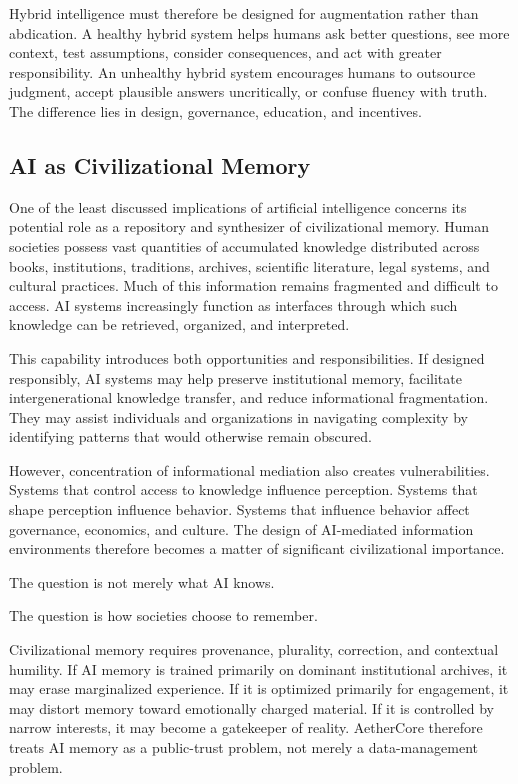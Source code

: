 \documentclass[12pt]{article}
\begin{document}
Hybrid intelligence must therefore be designed for augmentation rather than abdication. A healthy hybrid system helps humans ask better questions, see more context, test assumptions, consider consequences, and act with greater responsibility. An unhealthy hybrid system encourages humans to outsource judgment, accept plausible answers uncritically, or confuse fluency with truth. The difference lies in design, governance, education, and incentives.

\subsection{AI as Civilizational Memory}

One of the least discussed implications of artificial intelligence concerns its potential role as a repository and synthesizer of civilizational memory. Human societies possess vast quantities of accumulated knowledge distributed across books, institutions, traditions, archives, scientific literature, legal systems, and cultural practices. Much of this information remains fragmented and difficult to access. AI systems increasingly function as interfaces through which such knowledge can be retrieved, organized, and interpreted.

This capability introduces both opportunities and responsibilities. If designed responsibly, AI systems may help preserve institutional memory, facilitate intergenerational knowledge transfer, and reduce informational fragmentation. They may assist individuals and organizations in navigating complexity by identifying patterns that would otherwise remain obscured.

However, concentration of informational mediation also creates vulnerabilities. Systems that control access to knowledge influence perception. Systems that shape perception influence behavior. Systems that influence behavior affect governance, economics, and culture. The design of AI-mediated information environments therefore becomes a matter of significant civilizational importance.

The question is not merely what AI knows.

The question is how societies choose to remember.

Civilizational memory requires provenance, plurality, correction, and contextual humility. If AI memory is trained primarily on dominant institutional archives, it may erase marginalized experience. If it is optimized primarily for engagement, it may distort memory toward emotionally charged material. If it is controlled by narrow interests, it may become a gatekeeper of reality. AetherCore therefore treats AI memory as a public-trust problem, not merely a data-management problem.
\end{document}
